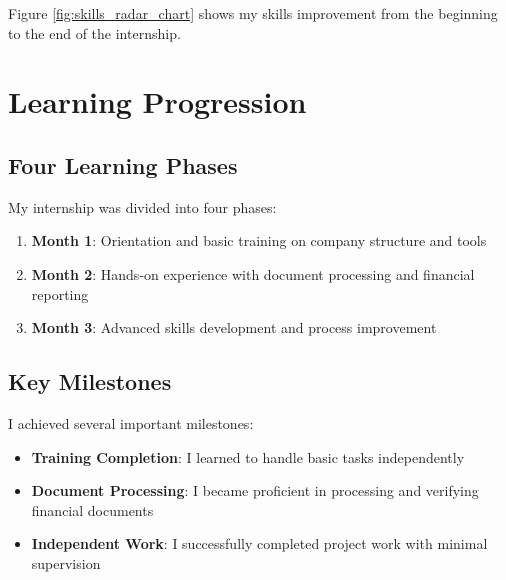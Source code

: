 Figure \ref{fig:skills_radar_chart} shows my skills improvement from the beginning to the end of the internship.

\section{Learning Progression}

\subsection{Four Learning Phases}
My internship was divided into four phases:

\begin{enumerate}[leftmargin=*, itemsep=0.25em]
                \item \textbf{Month 1}: Orientation and basic training on company structure and tools
            \item \textbf{Month 2}: Hands-on experience with document processing and financial reporting
            \item \textbf{Month 3}: Advanced skills development and process improvement
\end{enumerate}

\subsection{Key Milestones}
I achieved several important milestones:

\begin{itemize}[leftmargin=*, itemsep=0.25em]
    \item \textbf{Training Completion}: I learned to handle basic tasks independently
    \item \textbf{Document Processing}: I became proficient in processing and verifying financial documents
    \item \textbf{Independent Work}: I successfully completed project work with minimal supervision
\end{itemize}


